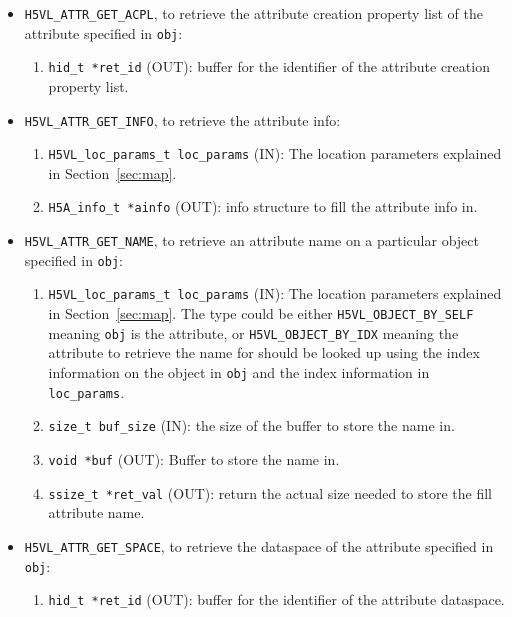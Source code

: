 \begin{itemize}

\item \texttt{H5VL\_ATTR\_GET\_ACPL}, to retrieve the attribute creation
  property list of the attribute specified in \texttt{obj}:
  \begin{enumerate}
  \item \texttt{hid\_t *ret\_id} (OUT): buffer for the identifier of the
    attribute creation property list.
  \end{enumerate}

\item \texttt{H5VL\_ATTR\_GET\_INFO}, to retrieve the attribute info:
  \begin{enumerate}
  \item \texttt{H5VL\_loc\_params\_t loc\_params} (IN): The location parameters
    explained in Section~\ref{sec:map}. 
  \item \texttt{H5A\_info\_t *ainfo} (OUT): info structure to fill the
    attribute info in.
  \end{enumerate}

\item \texttt{H5VL\_ATTR\_GET\_NAME}, to retrieve an attribute name on a
  particular object specified in \texttt{obj}:
  \begin{enumerate}
  \item \texttt{H5VL\_loc\_params\_t loc\_params} (IN): The location parameters
    explained in Section~\ref{sec:map}. The type could be either
    \texttt{H5VL\_OBJECT\_BY\_SELF} meaning \texttt{obj} is the attribute,
    or \texttt{H5VL\_OBJECT\_BY\_IDX} meaning the attribute to retrieve
    the name for should be looked up using the index information on
    the object in \texttt{obj} and the index information in \texttt{loc\_params}.
  \item \texttt{size\_t buf\_size} (IN): the size of the buffer to store
    the name in.
  \item \texttt{void *buf} (OUT): Buffer to store the name in.
  \item \texttt{ssize\_t *ret\_val} (OUT): return the actual size needed
    to store the fill attribute name.
  \end{enumerate}

\item \texttt{H5VL\_ATTR\_GET\_SPACE}, to retrieve the dataspace of the
  attribute specified in \texttt{obj}:
  \begin{enumerate}
  \item \texttt{hid\_t *ret\_id} (OUT): buffer for the identifier of the
    attribute dataspace.
  \end{enumerate}


\end{itemize}
